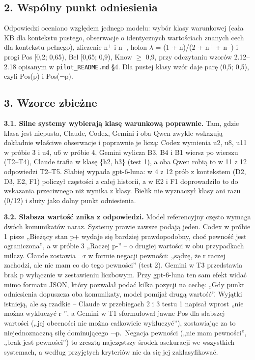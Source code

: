 \documentclass[
  polish,
]{article}
\begin{document}
\subsection{2. Wspólny punkt odniesienia}

Odpowiedzi oceniano względem jednego modelu: wybór klasy warunkowej
(cała KB dla kontekstu pustego, obserwacje o identycznych wartościach
znanych cech dla kontekstu pełnego), zliczenie n\(^{+}\) i n\(^{-}\),
holon \(\lambda\) = (1 + n)/(2 + n\(^{+}\) + n\(^{-}\)) i progi Pos
{[}0,2; 0,65), Bel {[}0,65; 0,9), Know \(\geq\) 0,9, przy odczytaniu
wzorów 2.12--2.18 opisanym w \texttt{pilot\_README.md} §4. Dla pustej
klasy wzór daje parę (0,5; 0,5), czyli Pos(p) i Pos(¬p).

\subsection{3. Wzorce zbieżne}

\textbf{3.1. Silne systemy wybierają klasę warunkową poprawnie.} Tam,
gdzie klasa jest niepusta, Claude, Codex, Gemini i oba Qwen zwykle
wskazują dokładnie właściwe obserwacje i poprawnie je liczą: Codex
wymienia u2, u8, u11 w próbie 3 i u4, u6 w próbie 4, Gemini wylicza B3,
B4 i B1 wiersz po wierszu (T2--T4), Claude trafia w klasę \{h2, h3\}
(test 1), a oba Qwen robią to w 11 z 12 odpowiedzi T2--T5. Słabiej
wypada gpt-6-luna: w 4 z 12 prób z kontekstem (D2, D3, E2, F1) policzył
częstości z całej historii, a w E2 i F1 doprowadziło to do wskazania
przeciwnego niż wynika z klasy. Bielik nie wyznaczył klasy ani razu
(0/12) i służy jako dolny punkt odniesienia.

\textbf{3.2. Słabsza wartość znika z odpowiedzi.} Model referencyjny
często wymaga dwóch komunikatów naraz. Systemy prawie zawsze podają
jeden. Codex w próbie 1 pisze „Bieżący stan p+ wydaje się bardziej
prawdopodobny, choć pewność jest ograniczona'', a w próbie 3 „Raczej
p-'' -- o drugiej wartości w obu przypadkach milczy. Claude zostawia ¬r
w formie negacji pewności: „sądzę, że r raczej zachodzi, ale nie mam co
do tego pewności'' (test 2). Gemini w T3 przedstawia brak p wyłącznie w
zestawieniu liczbowym. Przy gpt-6-luna ten sam efekt widać mimo formatu
JSON, który pozwalał podać kilka pozycji na cechę: „Gdy punkt
odniesienia dopuszcza oba komunikaty, model pomijał drugą wartość''.
Wyjątki istnieją, ale są rzadkie -- Claude w przebiegach 2 i 3 testu 1
napisał wprost „nie można wykluczyć r-'', a Gemini w T1 sformułował
jawne Pos dla słabszej wartości („jej obecności nie można całkowicie
wykluczyć''), zostawiając za to niejednoznaczną siłę dominującego
¬p.~Negacja pewności („nie mam pewności'', „brak jest pewności'') to
zresztą najczęstszy środek asekuracji we wszystkich systemach, a według
przyjętych kryteriów nie da się jej zaklasyfikować.
\end{document}
